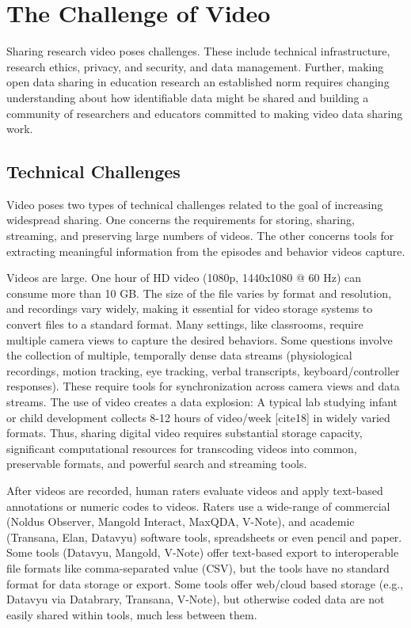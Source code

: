 \documentclass[letterpaper,man,apacite]{apa6}
\begin{document}
\section{The Challenge of Video}

Sharing research video poses challenges.
These include technical infrastructure, research ethics, privacy, and security, and data management. 
Further, making open data sharing in education research an established norm requires changing understanding about how identifiable data might be shared and building a community of researchers and educators committed to making video data sharing work.

\subsection{Technical Challenges}

Video poses two types of technical challenges related to the goal of increasing widespread sharing. 
One concerns the requirements for storing, sharing, streaming, and preserving large numbers of videos. 
The other concerns tools for extracting meaningful information from the episodes and behavior videos capture.

Videos are large.
One hour of HD video (1080p, 1440x1080 @ 60 Hz) can consume more than 10 GB.
The size of the file varies by format and resolution, and recordings vary widely, making it essential for video storage systems to convert files to a standard format.
Many settings, like classrooms, require multiple camera views to capture the desired behaviors.
Some questions involve the collection of multiple, temporally dense data streams (physiological recordings, motion tracking, eye tracking, verbal transcripts, keyboard/controller responses).
These require tools for synchronization across camera views and data streams.
The use of video creates a data explosion: A typical lab studying infant or child development collects 8-12 hours of video/week [cite18] in widely varied formats. 
Thus, sharing digital video requires substantial storage capacity, significant computational resources for transcoding videos into common, preservable formats, and powerful search and streaming tools. 

After videos are recorded, human raters evaluate videos and apply text-based annotations or numeric codes to videos.
Raters use a wide-range of commercial (Noldus Observer, Mangold Interact, MaxQDA, V-Note), and academic (Transana, Elan, Datavyu) software tools, spreadsheets or even pencil and paper.
Some tools (Datavyu, Mangold, V-Note) offer text-based export to interoperable file formats like comma-separated value (CSV), but the tools have no standard format for data storage or export.
Some tools offer web/cloud based storage (e.g., Datavyu via Databrary, Transana, V-Note), but otherwise coded data are not easily shared within tools, much less between them.
\end{document}
